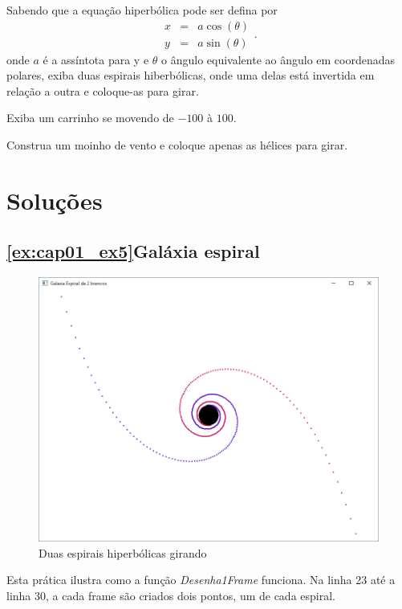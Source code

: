 





\begin{problems}
\prob
Sabendo que a equação hiperbólica pode ser defina por
$$
\begin{matrix}
x	& = &	a \cos(\theta) \\ 
y	& = &	a \sin(\theta)
\end{matrix}.
$$
onde $a$ é a assíntota para y e $\theta$ o ângulo equivalente ao ângulo em coordenadas polares, exiba duas espirais hiberbólicas, onde uma delas está invertida em relação a outra e coloque-as para girar.
\label{ex:cap01_ex5}

\prob
Exiba um carrinho se movendo de $-100$ à $100$.
\label{ex:cap01_ex6}

\prob
Construa um moinho de vento e coloque apenas as hélices para girar.
\label{ex:cap01_ex7}
\end{problems}

\section{Soluções}

\subsection{\ref{ex:cap01_ex5}Galáxia espiral}
\begin{figure}[ht]
  \centerline{\includegraphics[width=.5\textwidth]{img/cap1_ex6.png}}
  \caption{Duas espirais hiperbólicas girando}
  \label{fig:cap01_ex5}
\end{figure}
Esta prática ilustra como a função \emph{Desenha1Frame} funciona. Na linha 23 até a linha 30, a cada frame são criados dois pontos, um de cada espiral.



